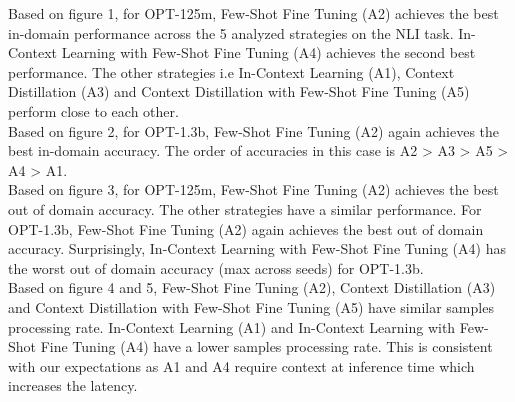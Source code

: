 \documentclass[10pt,twocolumn,letterpaper]{article}
\begin{document}
Based on figure 1, for OPT-125m, Few-Shot Fine Tuning (A2) achieves the best in-domain performance across the 5 analyzed strategies on the NLI task. In-Context Learning with Few-Shot Fine Tuning (A4) achieves the second best performance. The other strategies i.e In-Context Learning (A1), Context Distillation (A3) and Context Distillation with Few-Shot Fine Tuning (A5) perform close to each other.\\

Based on figure 2, for OPT-1.3b, Few-Shot Fine Tuning (A2) again achieves the best in-domain accuracy. The order of accuracies in this case is A2 > A3 > A5 > A4 > A1.\\



Based on figure 3, for OPT-125m, Few-Shot Fine Tuning (A2) achieves the best out of domain accuracy. The other strategies have a similar performance. For OPT-1.3b, Few-Shot Fine Tuning (A2) again achieves the best out of domain accuracy. Surprisingly, In-Context Learning with Few-Shot Fine Tuning (A4) has the worst out of domain accuracy (max across seeds) for OPT-1.3b.\\


Based on figure 4 and 5, Few-Shot Fine Tuning (A2), Context Distillation (A3) and Context Distillation with Few-Shot Fine Tuning (A5) have similar samples processing rate. In-Context Learning (A1) and In-Context Learning with Few-Shot Fine Tuning (A4) have a lower samples processing rate. This is consistent with our expectations as A1 and A4 require context at inference time which increases the latency.\\

\end{document}
